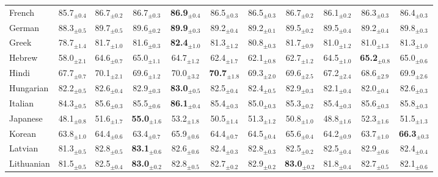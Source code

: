 \begin{table*}[ht]
{\begin{tabular}{lcccccccccc}
French & 85.7$_{\pm 0.4}$ & 86.7$_{\pm 0.2}$ & 86.7$_{\pm 0.3}$ & \textbf{86.9}$_{\pm 0.4}$ & 86.5$_{\pm 0.3}$ & 86.5$_{\pm 0.3}$ & 86.7$_{\pm 0.2}$ & 86.1$_{\pm 0.2}$ & 86.3$_{\pm 0.3}$ & 86.4$_{\pm 0.3}$ \\
German & 88.3$_{\pm 0.5}$ & 89.7$_{\pm 0.5}$ & 89.6$_{\pm 0.2}$ & \textbf{89.9}$_{\pm 0.3}$ & 89.2$_{\pm 0.4}$ & 89.2$_{\pm 0.1}$ & 89.5$_{\pm 0.2}$ & 89.5$_{\pm 0.4}$ & 89.2$_{\pm 0.4}$ & 89.8$_{\pm 0.3}$ \\
Greek & 78.7$_{\pm 1.4}$ & 81.7$_{\pm 1.0}$ & 81.6$_{\pm 0.3}$ & \textbf{82.4}$_{\pm 1.0}$ & 81.3$_{\pm 1.2}$ & 80.8$_{\pm 0.3}$ & 81.7$_{\pm 0.9}$ & 81.0$_{\pm 1.2}$ & 81.0$_{\pm 1.3}$ & 81.3$_{\pm 1.0}$ \\
Hebrew & 58.0$_{\pm 2.1}$ & 64.6$_{\pm 0.7}$ & 65.0$_{\pm 1.1}$ & 64.7$_{\pm 1.2}$ & 62.4$_{\pm 1.7}$ & 62.1$_{\pm 0.8}$ & 62.7$_{\pm 1.2}$ & 64.5$_{\pm 1.0}$ & \textbf{65.2}$_{\pm 0.8}$ & 65.0$_{\pm 0.6}$ \\
Hindi & 67.7$_{\pm 0.7}$ & 70.1$_{\pm 2.1}$ & 69.6$_{\pm 1.2}$ & 70.0$_{\pm 3.2}$ & \textbf{70.7}$_{\pm 1.8}$ & 69.3$_{\pm 2.0}$ & 69.6$_{\pm 2.5}$ & 67.2$_{\pm 2.4}$ & 68.6$_{\pm 2.9}$ & 69.9$_{\pm 2.6}$ \\
Hungarian & 82.2$_{\pm 0.5}$ & 82.6$_{\pm 0.4}$ & 82.9$_{\pm 0.3}$ & \textbf{83.0}$_{\pm 0.5}$ & 82.5$_{\pm 0.4}$ & 82.4$_{\pm 0.5}$ & 82.9$_{\pm 0.3}$ & 82.1$_{\pm 0.4}$ & 82.0$_{\pm 0.4}$ & 82.6$_{\pm 0.3}$ \\
Italian & 84.3$_{\pm 0.5}$ & 85.6$_{\pm 0.3}$ & 85.5$_{\pm 0.6}$ & \textbf{86.1}$_{\pm 0.4}$ & 85.4$_{\pm 0.3}$ & 85.0$_{\pm 0.3}$ & 85.3$_{\pm 0.2}$ & 85.4$_{\pm 0.3}$ & 85.6$_{\pm 0.3}$ & 85.8$_{\pm 0.3}$ \\
Japanese & 48.1$_{\pm 0.8}$ & 51.6$_{\pm 1.7}$ & \textbf{55.0}$_{\pm 1.6}$ & 53.2$_{\pm 1.8}$ & 50.5$_{\pm 1.4}$ & 51.3$_{\pm 1.2}$ & 50.8$_{\pm 1.0}$ & 48.8$_{\pm 1.6}$ & 52.3$_{\pm 1.6}$ & 51.5$_{\pm 1.3}$ \\
Korean & 63.8$_{\pm 1.0}$ & 64.4$_{\pm 0.6}$ & 63.4$_{\pm 0.7}$ & 65.9$_{\pm 0.6}$ & 64.4$_{\pm 0.7}$ & 64.5$_{\pm 0.4}$ & 65.6$_{\pm 0.4}$ & 64.2$_{\pm 0.9}$ & 63.7$_{\pm 1.0}$ & \textbf{66.3}$_{\pm 0.3}$ \\
Latvian & 81.3$_{\pm 0.5}$ & 82.8$_{\pm 0.5}$ & \textbf{83.1}$_{\pm 0.6}$ & 82.6$_{\pm 0.6}$ & 82.4$_{\pm 0.3}$ & 82.8$_{\pm 0.3}$ & 82.5$_{\pm 0.2}$ & 82.5$_{\pm 0.4}$ & 82.9$_{\pm 0.6}$ & 82.4$_{\pm 0.4}$ \\
Lithuanian & 81.5$_{\pm 0.5}$ & 82.5$_{\pm 0.4}$ & \textbf{83.0}$_{\pm 0.2}$ & 82.8$_{\pm 0.5}$ & 82.7$_{\pm 0.2}$ & 82.9$_{\pm 0.2}$ & \textbf{83.0}$_{\pm 0.2}$ & 81.8$_{\pm 0.4}$ & 82.7$_{\pm 0.5}$ & 82.1$_{\pm 0.6}$ \\

\end{tabular}}
\end{table*}
